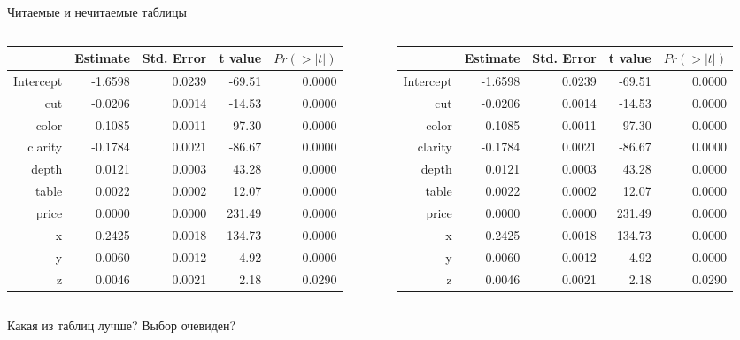 \documentclass[aspectratio=169]{beamer} %
\begin{document}
\begin{frame}{Читаемые и нечитаемые таблицы} 
\begin{columns}
\begin{column}{.49\linewidth}
\tiny
\begin{tabular}{|r|r|r|r|r|}
\hline
& Estimate & Std. Error & t value & $Pr( > | t |)$ \\
\hline
Intercept & -1.6598 & 0.0239 & -69.51 & 0.0000 \\ \hline
cut & -0.0206 & 0.0014 & -14.53 & 0.0000 \\ \hline
color & 0.1085 & 0.0011 & 97.30 & 0.0000 \\ \hline
clarity & -0.1784 & 0.0021 & -86.67 & 0.0000 \\ \hline
depth & 0.0121 & 0.0003 & 43.28 & 0.0000 \\ \hline
table & 0.0022 & 0.0002 & 12.07 & 0.0000 \\ \hline
price & 0.0000 & 0.0000 & 231.49 & 0.0000 \\ \hline
x & 0.2425 & 0.0018 & 134.73 & 0.0000 \\ \hline
y & 0.0060 & 0.0012 & 4.92 & 0.0000 \\ \hline
z & 0.0046 & 0.0021 & 2.18 & 0.0290 \\ 
\hline
\end{tabular}
\end{column}
\begin{column}{.49\linewidth}
\tiny
\begin{tabular}{rrrrr}
\toprule
& Estimate & Std. Error & t value & $Pr( > | t |)$ \\
\midrule
Intercept & -1.6598 & 0.0239 & -69.51 & 0.0000 \\ 
cut & -0.0206 & 0.0014 & -14.53 & 0.0000 \\ 
color & 0.1085 & 0.0011 & 97.30 & 0.0000 \\ 
clarity & -0.1784 & 0.0021 & -86.67 & 0.0000 \\ 
depth & 0.0121 & 0.0003 & 43.28 & 0.0000 \\ 
table & 0.0022 & 0.0002 & 12.07 & 0.0000 \\ 
price & 0.0000 & 0.0000 & 231.49 & 0.0000 \\ 
x & 0.2425 & 0.0018 & 134.73 & 0.0000 \\
y & 0.0060 & 0.0012 & 4.92 & 0.0000 \\
z & 0.0046 & 0.0021 & 2.18 & 0.0290 \\ 
\bottomrule
\end{tabular}
\end{column}
\end{columns}

\vspace{1cm}
\centering
\Large
\alert{Какая из таблиц лучше? Выбор очевиден?} 
\end{frame}
\end{document}
